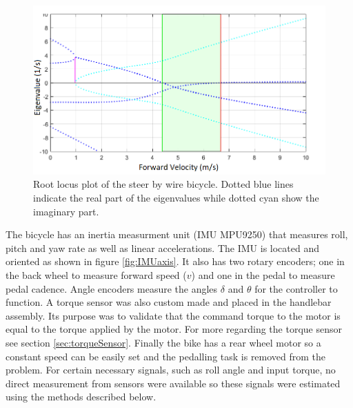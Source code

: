 \begin{figure}[ht]
    \centering
    \captionsetup{justification=centering,margin=2cm}

    \includegraphics[scale=0.6]{images/root_locus_steerbywire.png}
    \caption{Root locus plot of the steer by wire bicycle. Dotted blue lines indicate the real part of the eigenvalues while dotted cyan show the imaginary part.}
    \label{fig:rootlocus}
\end{figure}
The bicycle has an inertia measurment unit (IMU MPU9250) that measures roll, pitch and yaw rate as well as linear accelerations. The IMU is located and oriented as shown in figure \ref{fig:IMUaxis}. It also has two rotary encoders; one in the back wheel to measure forward speed (\ensuremath{v}) and one in the pedal to measure pedal cadence. Angle encoders measure the angles \ensuremath{\delta} and \ensuremath{\theta} for the controller to function. A torque sensor was also custom made and placed in the handlebar assembly. Its purpose was to validate that the command torque to the motor is equal to the torque applied by the motor. For more regarding the torque sensor see section \ref{sec:torqueSensor}.  Finally the bike has a rear wheel motor so  a constant speed can be easily set and the pedalling task is removed from the problem. For certain necessary  signals, such as roll angle and input torque, no direct measurement from sensors were available so these signals were estimated using the methods described below.
